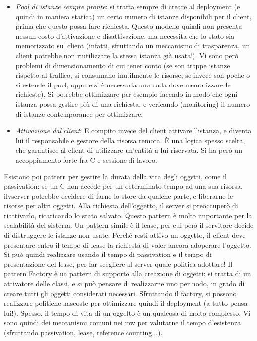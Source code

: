 \begin{itemize}
 \item \textit{Pool di istanze sempre pronte}: si tratta sempre di creare al deployment (e quindi in maniera statica)
 un certo numero di istanze disponibili per il client, prima che questo possa fare richiesta. Questo modello quindi
 non presenta nessun costo d'attivazione e disattivazione, ma necessita che lo stato sia memorizzato sul client
 (infatti, sfruttando un meccanismo di trasparenza, un client potrebbe non riutilizzare la stessa istanza già usata!).
 Vi sono però problemi di dimensionamento di cui tener conto (se son troppe istanze rispetto al traffico, si consumano
 inutilmente le risorse, se invece son poche o si estende il pool, oppure si è necessaria una coda dove memorizzare le
 richieste). Si potrebbe ottimizzare per esempio facendo in modo che ogni istanza possa gestire più di una richiesta, 
 e vericando (monitoring) il numero di istanze contemporanee per ottimizzare.
 \item \textit{Attivazione dal client}: E compito invece del client attivare l'istanza, e diventa lui il responsabile
 e gestore della risorsa remota. È una logica spesso scelta, che garantisce al client di utilizzare un'entità a lui
 riservata. Si ha però un accoppiamento forte fra C e sessione di lavoro.
\end{itemize}
Esistono poi pattern per gestire la durata della vita degli oggetti, come il passivation: se un C non accede per un
determinato tempo ad una sua risorsa, ilvserver potrebbe decidere di farne lo store da qualche parte, e liberarne le
risorse per altri oggetti. Alla richiesta dell'oggetto, il server si preoccuperò di riattivarlo, ricaricando lo stato
salvato. Questo pattern è molto importante per la scalabilità del sistema.
Un pattern simile è il lease, per cui però il servitore decide di distruggere le istanze non usate. Perché resti 
attivo un oggetto, il client deve presentare entro il tempo di lease la richiesta di voler ancora adoperare l'oggetto.
Si può quindi realizzare usando il tempo di passivation e il tempo di presentazione del lease, per far scegliere al
server quale politica adottare!
Il pattern Factory è un pattern di supporto alla creazione di oggetti: si tratta di un attivatore delle classi, e si 
può pensare di realizzarne uno per nodo, in grado di creare tutti gli oggetti considerati necessari. Sfruttando il
factory, si possono realizzare politiche nascoste per ottimizzare quindi il deployment (a tutto pensa lui!).
Spesso, il tempo di vita di un oggetto è un qualcosa di molto complesso. Vi sono quindi dei meccanismi comuni nei mw 
per valutarne il tempo d'esistenza (sfruttando passivation, lease, reference counting...).
